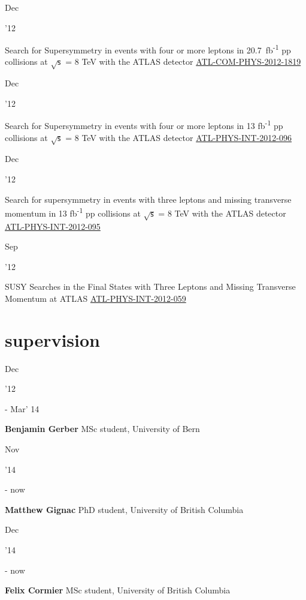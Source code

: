 \documentclass[]{cv} %
\begin{document}
\begin{entrylist}
\entry
{\parbox[t]{\parboxWidthOne}{Dec}\parbox[t]{\parboxWidthTwo}{\hfill '12}}
{Search for Supersymmetry in events with four or more leptons in 20.7~fb\textsuperscript{-1} pp collisions at $\sqrt{\mathsf{s}}$
= 8 TeV with the ATLAS detector}
{\href{https://cds.cern.ch/record/1501709}{ATL-COM-PHYS-2012-1819}}
{\vspace*{\spacingPubs}}

\entry
{\parbox[t]{\parboxWidthOne}{Dec}\parbox[t]{\parboxWidthTwo}{\hfill '12}}
{Search for Supersymmetry in events with four or more leptons in 13 fb\textsuperscript{-1} pp collisions at $\sqrt{\mathsf{s}}$ =
8 TeV with the ATLAS detector}
{\href{https://cds.cern.ch/record/1498627}{ATL-PHYS-INT-2012-096}}
{\vspace*{\spacingPubs}}

\entry
{\parbox[t]{\parboxWidthOne}{Dec}\parbox[t]{\parboxWidthTwo}{\hfill '12}}
{Search for supersymmetry in events with three leptons and missing transverse momentum in 13 fb\textsuperscript{-1} pp collisions
at $\sqrt{\mathsf{s}}$ = 8 TeV with the ATLAS detector}
{\href{https://cds.cern.ch/record/1498390}{ATL-PHYS-INT-2012-095}}
{\vspace*{\spacingPubs}}

\entry
{\parbox[t]{\parboxWidthOne}{Sep}\parbox[t]{\parboxWidthTwo}{\hfill '12}}
{SUSY Searches in the Final States with Three Leptons and Missing Transverse Momentum at ATLAS}
{\href{https://cds.cern.ch/record/1482141}{ATL-PHYS-INT-2012-059}}
{\vspace*{\spacingPubs}}

\end{entrylist}
\fi

\section{supervision}

\begin{entrylist}

  \entry
  {\parbox[t]{\parboxWidthOne}{Dec}\parbox[t]{\parboxWidthTwo}{\hfill '12} -
Mar' 14}
{\textbf{Benjamin Gerber}}
  {}
  {MSc student, University of Bern}

  \entry
  {\parbox[t]{\parboxWidthOne}{Nov}\parbox[t]{\parboxWidthTwo}{\hfill '14} -
now}
{\textbf{Matthew Gignac}}
  {}
  {PhD student, University of British Columbia}

  \entry
  {\parbox[t]{\parboxWidthOne}{Dec}\parbox[t]{\parboxWidthTwo}{\hfill '14} -
now}
{\textbf{Felix Cormier}}
  {}
  {MSc student, University of British Columbia}

\end{entrylist}
\end{document}
